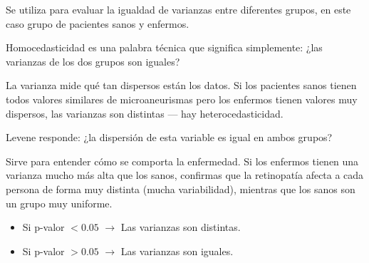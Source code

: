 \begin{itemize}
    Se utiliza para evaluar la igualdad de varianzas entre diferentes grupos, en este caso grupo de pacientes sanos y enfermos.

    Homocedasticidad es una palabra técnica que significa simplemente: ¿las varianzas de los dos grupos son iguales?
    
    La varianza mide qué tan dispersos están los datos. Si los pacientes sanos tienen todos valores similares de microaneurismas pero los enfermos tienen valores muy dispersos, las varianzas son distintas — hay heterocedasticidad.

    Levene responde: ¿la dispersión de esta variable es igual en ambos grupos?

    Sirve para entender cómo se comporta la enfermedad. Si los enfermos tienen una varianza mucho más alta que los sanos, confirmas que la retinopatía afecta a cada persona de forma muy distinta (mucha variabilidad), mientras que los sanos son un grupo muy uniforme.

    \begin{itemize}
        \item Si p-valor $< 0.05$ $\rightarrow$ Las varianzas son distintas.
        \item Si p-valor $> 0.05$ $\rightarrow$ Las varianzas son iguales.
    \end{itemize}
\end{itemize}

